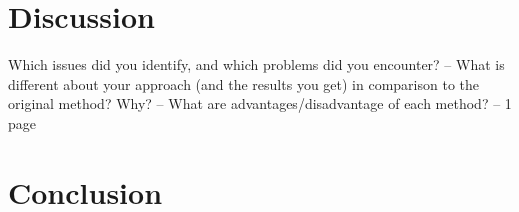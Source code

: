 \documentclass[a4paper, 11pt, twocolumn]{article}
\begin{document}
\section{Discussion}
Which issues did you identify, and which problems
did you encounter?
– What is different about your approach (and the
results you get) in comparison to the original
method? Why?
– What are advantages/disadvantage of each
method?
– 1 page
\section{Conclusion} 


\end{document}
